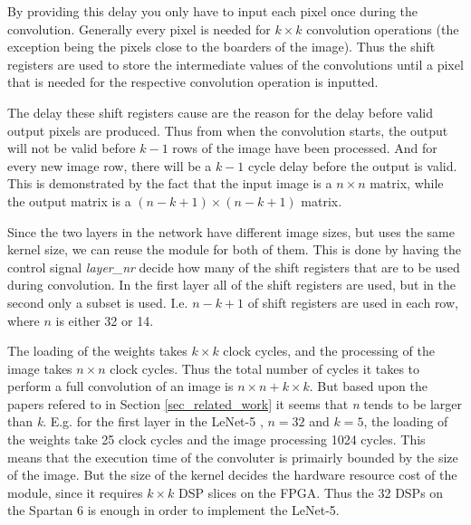 By providing this delay you only have to input each pixel once during the convolution. Generally every pixel is needed for $ k \times k $ convolution operations (the exception being the pixels close to the boarders of the image). Thus the shift registers are used to store the intermediate values of the convolutions until a pixel that is needed for the respective convolution operation is inputted. 

The delay these shift registers cause are the reason for the delay before valid output pixels are produced. Thus from when the convolution starts, the output will not be valid before $ k-1 $ rows of the image have been processed. And for every new image row, there will be a $ k-1 $ cycle delay before the output is valid. This is demonstrated by the fact that the input image is a $ n \times n $ matrix, while the output matrix is a $ (n-k+1) \times (n-k+1) $ matrix. 

Since the two layers in the network have different image sizes, but uses the same kernel size, we can reuse the module for both of them. This is done by having the control signal \textit{layer\_nr} decide how many of the shift registers that are to be used during convolution. In the first layer all of the shift registers are used, but in the second only a subset is used. I.e. $ n-k+1 $ of shift registers are used in each row, where $ n $ is either 32 or 14. 

The loading of the weights takes $ k \times k $ clock cycles, and the processing of the image takes $ n \times n $ clock cycles. Thus the total number of cycles it takes to perform a full convolution of an image is $ n \times n + k \times k $. But based upon the papers refered to in Section \ref{sec_related_work} it seems that \textit{n} tends to be larger than \textit{k}. E.g. for the first layer in the LeNet-5 \cite{LeCun1998}, $ n = 32 $ and $ k = 5 $, the loading  of the weights take 25 clock cycles and the image processing 1024 cycles. This means that the execution time of the convoluter is primairly bounded by the size of the image. But the size of the kernel decides the hardware resource cost of the module, since it requires $ k \times k $ DSP slices on the FPGA. Thus the 32 DSPs on the Spartan 6 is enough in order to implement the LeNet-5. 

